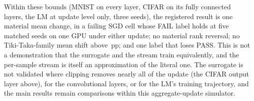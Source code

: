 Within these bounds (MNIST on every layer, CIFAR on its fully connected layers, the LM at update level only, three seeds), the
registered result is one material mean change, in a failing SGD cell whose FAIL label holds at five matched seeds on one GPU under either update; no
material rank reversal; no Tiki-Taka-family mean shift above \RXFidTtMaxAbs\,pp; and one label that loses PASS. This is not a
demonstration that the surrogate and the stream train equivalently, and the per-sample stream is itself an approximation of the
literal one. The surrogate is not validated where clipping removes nearly all of the update (the CIFAR output layer above), for
the convolutional layers, or for the LM's training trajectory, and the main results remain comparisons within this
aggregate-update simulator.






